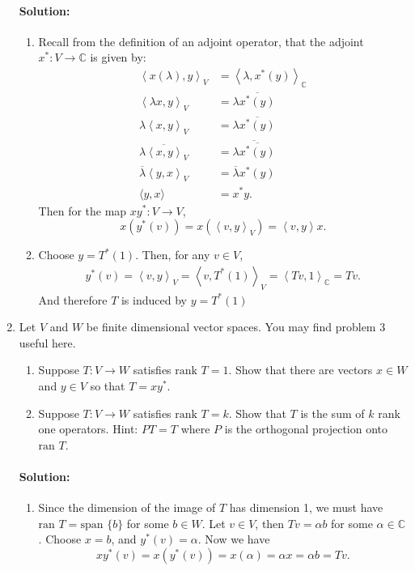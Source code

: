 \documentclass{article}
\begin{document}
\begin{enumerate}
\paragraph{Solution: } 
\begin{enumerate}[label= (\alph*)] 
    \item Recall from the definition of an adjoint operator, that the adjoint $x^* :V\to \mathbb{C}$ is given by:
        \begin{align*}
            \left< x(\lambda),y \right>_V &=\left<\lambda,x^* (y) \right>_{\mathbb{C}}\\
            \left<\lambda x,y \right>_V&= \lambda \overline{x^* (y)} \\
            \lambda\left< x,y \right>_V&= \lambda \overline{x^* (y)} \\
            \overline{\lambda\left< x,y \right>_V}&= \overline{\lambda \overline{x^* (y)}} \\
            \overline{\lambda}\left< y,x \right>_V&= \overline{\lambda} {x^* (y)} \\
            \langle y, x\rangle&= x^* y
        .\end{align*}
        Then for the map $xy^* :V\to V$, 
        \[
            x(y^* (v))=x(\left<v,y \right>_V)=\left<v,y \right> x
        .\] 
    \item Choose $y=T^* (1).$ Then, for any $v\in V$, 
        \begin{align*}
            y^* (v)=\left<v,y \right>_V=\left<v,T^* (1) \right>_V = \left<Tv,1 \right>_{\mathbb{C}}=Tv
        .\end{align*}
        And therefore $T$ is induced by $y=T^* (1)$
\end{enumerate}

\item Let $V$ and $W$ be finite dimensional vector spaces. You may find problem 3 useful here. \begin{enumerate}[label= (\alph*)] 
    \item Suppose $T: V \to W$ satisfies $\text{rank } T = 1$. Show that there are vectors $x \in W$ and $y \in V$ so that $T = xy^*$.
    \item Suppose $T: V \to W$ satisfies $\text{rank } T = k$. Show that $T$ is the sum of $k$ rank one operators. Hint: $PT = T$ where $P$ is the orthogonal projection onto $\text{ran } T$.
\end{enumerate}
\paragraph{Solution: }
\begin{enumerate}[label= (\alph*)] 
    \item Since the dimension of the image of $T$ has dimension 1, we must have $\text{ran }T=\text{span }\{b\} $ for some $b\in W$. Let $v\in V$, then $Tv=\alpha b$ for some $\alpha\in \mathbb{C}$. Choose $x=b$, and $y^*(v)=\alpha$. Now we have 
        \[
        xy^* (v)=x(y^* (v))=x(\alpha)=\alpha x=\alpha b= Tv
        .\] 


\end{enumerate}
\end{enumerate}
\end{document}
